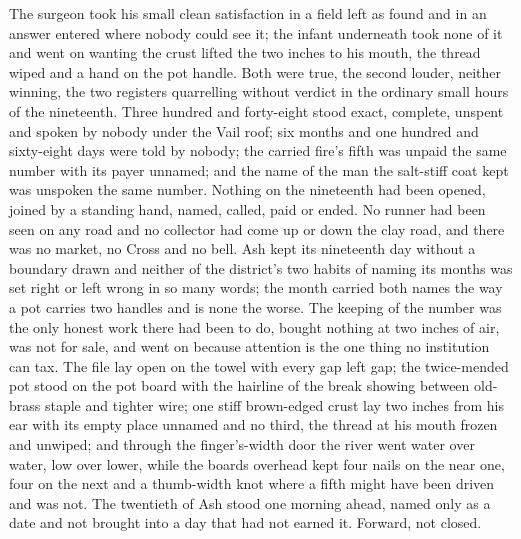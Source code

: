 The surgeon took his small clean satisfaction in a field left as found and in an answer entered where nobody could see it; the infant underneath took none of it and went on wanting the crust lifted the two inches to his mouth, the thread wiped and a hand on the pot handle. Both were true, the second louder, neither winning, the two registers quarrelling without verdict in the ordinary small hours of the nineteenth. Three hundred and forty-eight stood exact, complete, unspent and spoken by nobody under the Vail roof; six months and one hundred and sixty-eight days were told by nobody; the carried fire's fifth was unpaid the same number with its payer unnamed; and the name of the man the salt-stiff coat kept was unspoken the same number. Nothing on the nineteenth had been opened, joined by a standing hand, named, called, paid or ended. No runner had been seen on any road and no collector had come up or down the clay road, and there was no market, no Cross and no bell. Ash kept its nineteenth day without a boundary drawn and neither of the district's two habits of naming its months was set right or left wrong in so many words; the month carried both names the way a pot carries two handles and is none the worse. The keeping of the number was the only honest work there had been to do, bought nothing at two inches of air, was not for sale, and went on because attention is the one thing no institution can tax. The file lay open on the towel with every gap left gap; the twice-mended pot stood on the pot board with the hairline of the break showing between old-brass staple and tighter wire; one stiff brown-edged crust lay two inches from his ear with its empty place unnamed and no third, the thread at his mouth frozen and unwiped; and through the finger's-width door the river went water over water, low over lower, while the boards overhead kept four nails on the near one, four on the next and a thumb-width knot where a fifth might have been driven and was not. The twentieth of Ash stood one morning ahead, named only as a date and not brought into a day that had not earned it. Forward, not closed.
